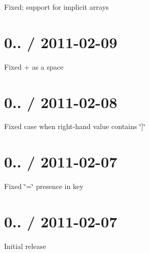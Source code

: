 \begin{DoxyItemize}
\item Fixed; support for implicit arrays
\end{DoxyItemize}

\section*{0.. / 2011-\/02-\/09 }


\begin{DoxyItemize}
\item Fixed {\ttfamily +} as a space
\end{DoxyItemize}

\section*{0.. / 2011-\/02-\/08 }


\begin{DoxyItemize}
\item Fixed case when right-\/hand value contains \char`\"{}\mbox{]}\char`\"{}
\end{DoxyItemize}

\section*{0.. / 2011-\/02-\/07 }


\begin{DoxyItemize}
\item Fixed \char`\"{}=\char`\"{} presence in key
\end{DoxyItemize}

\section*{0.. / 2011-\/02-\/07 }


\begin{DoxyItemize}
\item Initial release 
\end{DoxyItemize}